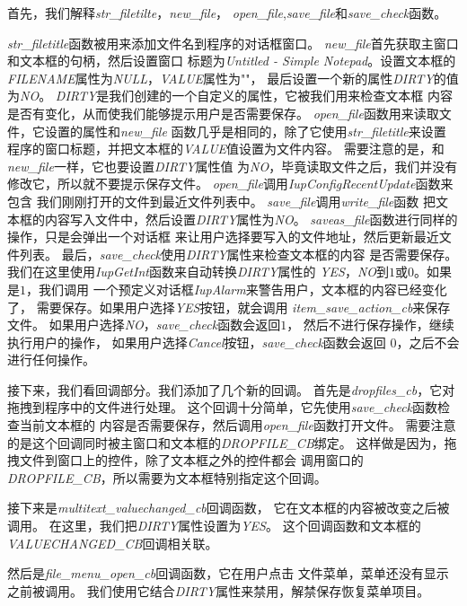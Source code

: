 \documentclass{ctexart}
\begin{document}
首先，我们解释\emph{str\_filetilte}，\emph{new\_file}，
\emph{open\_file},\emph{save\_file}和\emph{save\_check}函数。

\emph{str\_filetitle}函数被用来添加文件名到程序的对话框窗口。
\emph{new\_file}首先获取主窗口和文本框的句柄，然后设置窗口
标题为\emph{Untitled - Simple Notepad}。设置文本框的
\emph{FILENAME}属性为\emph{NULL}，\emph{VALUE}属性为""，
最后设置一个新的属性\emph{DIRTY}的值为\emph{NO}。
\emph{DIRTY}是我们创建的一个自定义的属性，它被我们用来检查文本框
内容是否有变化，从而使我们能够提示用户是否需要保存。
\emph{open\_file}函数用来读取文件，它设置的属性和\emph{new\_file}
函数几乎是相同的，除了它使用\emph{str\_filetitle}来设置
程序的窗口标题，并把文本框的\emph{VALUE}值设置为文件内容。
需要注意的是，和\emph{new\_file}一样，它也要设置\emph{DIRTY}属性值
为\emph{NO}，毕竟读取文件之后，我们并没有修改它，所以就不要提示保存文件。
\emph{open\_file}调用\emph{IupConfigRecentUpdate}函数来包含
我们刚刚打开的文件到最近文件列表中。
\emph{save\_file}调用\emph{write\_file}函数
把文本框的内容写入文件中，然后设置\emph{DIRTY}属性为\emph{NO}。
\emph{saveas\_file}函数进行同样的操作，只是会弹出一个对话框
来让用户选择要写入的文件地址，然后更新最近文件列表。
最后，\emph{save\_check}使用\emph{DIRTY}属性来检查文本框的内容
是否需要保存。
我们在这里使用\emph{IupGetInt}函数来自动转换\emph{DIRTY}属性的
\emph{YES}，\emph{NO}到$1$或$0$。如果是$1$，我们调用
一个预定义对话框\emph{IupAlarm}来警告用户，文本框的内容已经变化了，
需要保存。如果用户选择\emph{YES}按钮，就会调用
\emph{item\_save\_action\_cb}来保存文件。
如果用户选择\emph{NO}，\emph{save\_check}函数会返回$1$，
然后不进行保存操作，继续执行用户的操作，
如果用户选择\emph{Cancel}按钮，\emph{save\_check}函数会返回
$0$，之后不会进行任何操作。

接下来，我们看回调部分。我们添加了几个新的回调。
首先是\emph{dropfiles\_cb}，它对拖拽到程序中的文件进行处理。
这个回调十分简单，它先使用\emph{save\_check}函数检查当前文本框的
内容是否需要保存，然后调用\emph{open\_file}函数打开文件。
需要注意的是这个回调同时被主窗口和文本框的\emph{DROPFILE\_CB}绑定。
这样做是因为，拖拽文件到窗口上的控件，除了文本框之外的控件都会
调用窗口的\emph{DROPFILE\_CB}，所以需要为文本框特别指定这个回调。

接下来是\emph{multitext\_valuechanged\_cb}回调函数，
它在文本框的内容被改变之后被调用。
在这里，我们把\emph{DIRTY}属性设置为\emph{YES}。
这个回调函数和文本框的\emph{VALUECHANGED\_CB}回调相关联。

然后是\emph{file\_menu\_open\_cb}回调函数，它在用户点击
文件菜单，菜单还没有显示之前被调用。
我们使用它结合\emph{DIRTY}属性来禁用，解禁保存恢复菜单项目。
\end{document}
